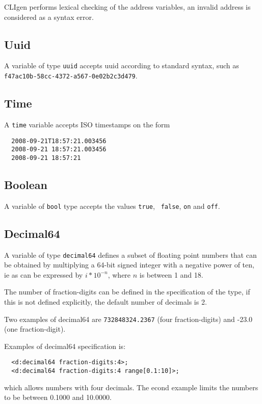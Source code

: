 \documentclass[a4paper, 10pt] {article}
\begin{document}
CLIgen performs lexical checking of the address variables, an invalid
address is considered as a syntax error.

\subsection{Uuid}

A variable of type {\tt uuid} accepts uuid according to standard syntax,
such as {\tt f47ac10b-58cc-4372-a567-0e02b2c3d479}. 


\subsection{Time}

A {\tt time} variable accepts ISO timestamps on the form

\begin{verbatim}
  2008-09-21T18:57:21.003456
  2008-09-21 18:57:21.003456
  2008-09-21 18:57:21
\end{verbatim}

\subsection{Boolean}

A variable of {\tt bool} type accepts the values {\tt true}, {\tt
  false}, {\tt on} and {\tt off}.

\subsection{Decimal64}

A variable of type {\tt decimal64} defines a subset of floating point
numbers that can be obtained by multiplying a 64-bit signed integer
with a negative power of ten, ie as can be expressed by $i * 10^{-n}$,
where $n$ is between 1 and 18.

The number of fraction-digits can be defined in the specification of
the type, if this is not defined explicitly, the default number of decimals is 2.

Two examples of decimal64 are {\tt 732848324.2367} (four
fraction-digits) and -23.0 (one fraction-digit).

Examples of decimal64 specification is:
\begin{verbatim}
  <d:decimal64 fraction-digits:4>;
  <d:decimal64 fraction-digits:4 range[0.1:10]>;
\end{verbatim}
which allows numbers with four decimals. The econd example limits the numbers to be between 0.1000 and 10.0000.
\end{document}
